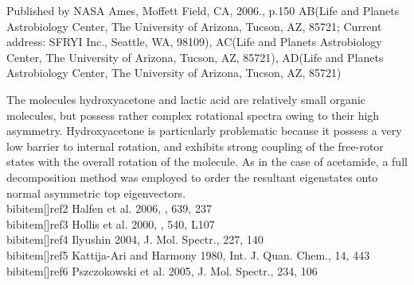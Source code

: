 Published by NASA Ames, Moffett Field, CA, 2006., p.150
AB(Life and Planets Astrobiology Center, The University of Arizona, Tucson, AZ, 85721; Current address: SFRYI Inc., Seattle, WA, 98109),
AC(Life and Planets Astrobiology Center, The University of Arizona, Tucson, AZ, 85721),
AD(Life and Planets Astrobiology Center, The University of Arizona, Tucson, AZ, 85721)

The molecules hydroxyacetone and lactic acid are relatively small organic molecules, but possess rather complex rotational spectra owing to their high asymmetry.  Hydroxyacetone is particularly problematic because it possess a very low barrier to internal rotation, and exhibits strong coupling of the free-rotor states with the overall rotation of the molecule.  As in the case of acetamide, a full decomposition method was employed to order the resultant eigenstates onto normal asymmetric top eigenvectors.
\\bibitem[]{ref2} Halfen et al.  2006, \apj, 639, 237
\\bibitem[]{ref3} Hollis et al.  2000, \apj, 540, L107
\\bibitem[]{ref4} Ilyushin  2004, J. Mol. Spectr., 227, 140
\\bibitem[]{ref5} Kattija-Ari and Harmony  1980, Int. J. Quan. Chem., 14, 443
\\bibitem[]{ref6} Pszczokowski et al.  2005, J. Mol. Spectr., 234, 106

